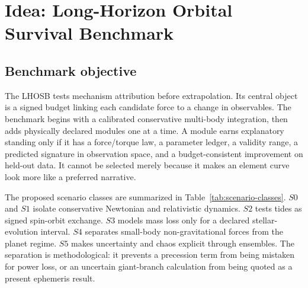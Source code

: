 \documentclass[10pt,conference]{IEEEtran}
\begin{document}
\section{Idea: Long-Horizon Orbital Survival Benchmark}
\label{sec:idea}

\subsection{Benchmark objective}

The LHOSB tests mechanism attribution before extrapolation. Its central object is a signed budget linking each candidate force to a change in observables. The benchmark begins with a calibrated conservative multi-body integration, then adds physically declared modules one at a time. A module earns explanatory standing only if it has a force/torque law, a parameter ledger, a validity range, a predicted signature in observation space, and a budget-consistent improvement on held-out data. It cannot be selected merely because it makes an element curve look more like a preferred narrative.

The proposed scenario classes are summarized in Table~\ref{tab:scenario-classes}. $S0$ and $S1$ isolate conservative Newtonian and relativistic dynamics. $S2$ tests tides as signed spin-orbit exchange. $S3$ models mass loss only for a declared stellar-evolution interval. $S4$ separates small-body non-gravitational forces from the planet regime. $S5$ makes uncertainty and chaos explicit through ensembles. The separation is methodological: it prevents a precession term from being mistaken for power loss, or an uncertain giant-branch calculation from being quoted as a present ephemeris result.
\end{document}
